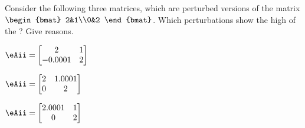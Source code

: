 \begin{exercise}  
Consider the following three matrices, which are perturbed versions of the matrix
\(\begin{bmat} 2&1\\0&2 \end{bmat}\).
Which perturbations show the high  of the ?  
Give reasons.
\begin{Parts}
\item \(\eAii=\begin{bmatrix} 2&1\\-0.0001&2 \end{bmatrix}\)

\item \(\eAii=\begin{bmatrix} 2&1.0001\\0&2 \end{bmatrix}\)

\item \(\eAii=\begin{bmatrix} 2.0001&1\\0&2 \end{bmatrix}\)

\end{Parts}
\end{exercise}





